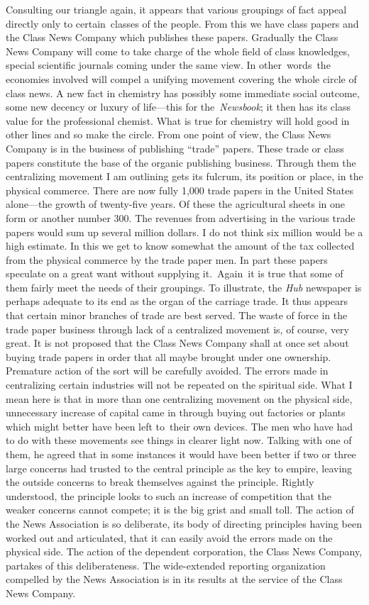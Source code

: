 \documentclass[openany,nobib]{tufte-book}
\begin{document}
Consulting our triangle again, it appears that various groupings of fact
appeal directly only to certain~classes of the people. From this we have
class papers and the Class News Company which publishes these papers.
Gradually the Class News Company will come to take charge of the whole
field of class knowledges, special scientific journals coming under the
same view. In other~words~the economies involved will compel a unifying
movement covering the whole circle of class news. A new fact in
chemistry has possibly some immediate social outcome, some new decency
or luxury of life---this for the~\emph{Newsbook}; it then has its class
value for the professional chemist. What is true for chemistry will hold
good in other lines and so make the circle. From one point of view, the
Class News Company is in the business of publishing ``trade'' papers.
These trade or class papers constitute the base of the organic
publishing business. Through them the centralizing movement I am
outlining gets its fulcrum, its position or place, in the physical
commerce. There are now fully 1,000 trade papers in the United States
alone---the growth of twenty-five years. Of these the agricultural
sheets in one form or another number 300. The revenues from advertising
in the various trade papers would sum up several million dollars. I do
not think six million would be a high estimate. In this we get to know
somewhat the amount of the tax collected from the physical commerce by
the trade paper men. In part these papers speculate on a great want
without supplying it.~Again~it is true that some of them fairly meet the
needs of their groupings. To illustrate, the \emph{Hub} newspaper is
perhaps adequate to its end as the organ of the carriage trade. It thus
appears that certain minor branches of trade are best served. The waste
of force in the trade paper business through lack of a centralized
movement is, of course, very great. It is not proposed that the Class
News Company shall at once set about buying trade papers in order that
all maybe brought under one ownership. Premature action of the sort will
be carefully avoided. The errors made in centralizing certain industries
will not be repeated on the spiritual side. What I mean here is that in
more than one centralizing movement on the physical side, unnecessary
increase of capital came in through buying out factories or plants which
might better have been left to~their own devices. The men who have had
to do with these movements see things in clearer light now. Talking with
one of them, he agreed that in some instances it would have been better
if two or three large concerns had trusted to the central principle as
the key to empire, leaving the outside concerns to break themselves
against the principle. Rightly understood, the principle looks to such
an increase of competition that the weaker concerns cannot compete; it
is the big grist and small toll. The action of the News Association is
so deliberate, its body of directing principles having been worked out
and articulated, that it can easily avoid the errors made on the
physical side. The action of the dependent corporation, the Class News
Company, partakes of this deliberateness. The wide-extended reporting
organization compelled by the News Association is in its results at the
service of the Class News Company.~
\end{document}
